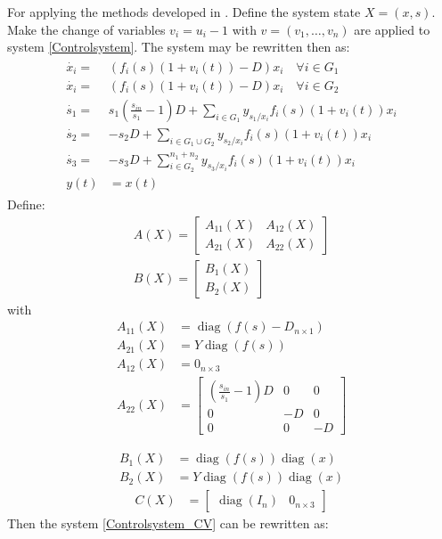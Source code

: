 \documentclass[3p,times]{article}
\DeclareMathOperator{\diag}{diag}
\begin{document}
For applying the methods developed in \cite{Cimen2004}. Define the system state $X = (x,s)$. Make the change of variables $v_i = u_i - 1$ with $v = (v_1,\dots,v_n)$ are applied to system \eqref{Controlsystem}. The system may be rewritten then as:
\begin{align} 
\label{Controlsystem_CV}
\begin{array}{cl}
\dot{x_i} =& \left(f_i(s)(1+v_i(t)) -D \right)x_i \quad \forall i \in G_1\\
\dot{x_i} =& \left(f_i(s)(1+v_i(t)) -D \right)x_i \quad \forall i \in G_2\\
\dot{s_1} =& \displaystyle s_1\left(\frac{s_{in}}{s_1}-1\right)D+\sum\limits_{i \in G_1}y_{s_1/x_i}f_i(s)(1+v_i(t)) x_i  \\
\dot{s_2} = & \displaystyle -s_2D+\sum\limits_{i \in G_1 \cup G_2}y_{s_2/x_i}f_i(s)(1+v_i(t))x_i	  \\
\dot{s_3} =&  \displaystyle -s_3D+\sum\limits_{i \in G_2}^{n_1+n_2}y_{s_3/x_i}f_i(s)(1+v_i(t)) x_i \\
y(t) & =x(t)
\end{array}
\end{align}	
Define: 
\begin{align}
\label{A_matrix} A\left (X\right) = \begin{bmatrix}
A_{11}(X) & A_{12}(X) \\ A_{21}(X) & A_{22}(X)
\end{bmatrix} \\
\label{B_matrix} B\left (X\right) = \begin{bmatrix}
B_1(X) \\ B_2(X)
\end{bmatrix} 
\end{align}
with 
\begin{align}
A_{11}(X) &= \diag(f(s)- D_{n\times 1} ) \\
A_{21}(X) &=  Y\diag(f(s))\\
A_{12}(X) &=  0_{n \times 3} \\
A_{22}(X) &= \begin{bmatrix} \left(\frac{s_{in}}{s_1}-1\right)D & 0 & 0 \\ 
0 &-D & 0 \\ 
0 & 0 &-D \end{bmatrix}
\end{align}

\begin{align}
B_1(X) &= \diag(f(s))\diag(x)  \\
B_2(X) &= Y\diag(f(s))\diag(x)
\end{align}
\begin{align}
C(X) & = \begin{bmatrix}
\diag(I_n) & 0_{n\times 3}
\end{bmatrix}
\end{align} 
Then the system \eqref{Controlsystem_CV} can be rewritten as:
\end{document}
